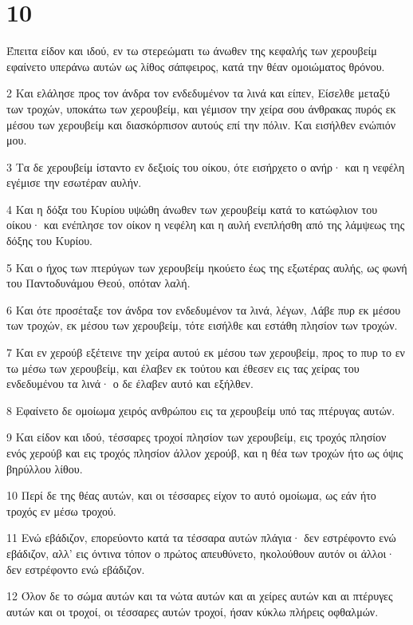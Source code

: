 \chapter{10}

\par Έπειτα είδον και ιδού, εν τω στερεώματι τω άνωθεν της κεφαλής των χερουβείμ εφαίνετο υπεράνω αυτών ως λίθος σάπφειρος, κατά την θέαν ομοιώματος θρόνου.
\par 2 Και ελάλησε προς τον άνδρα τον ενδεδυμένον τα λινά και είπεν, Είσελθε μεταξύ των τροχών, υποκάτω των χερουβείμ, και γέμισον την χείρα σου άνθρακας πυρός εκ μέσου των χερουβείμ και διασκόρπισον αυτούς επί την πόλιν. Και εισήλθεν ενώπιόν μου.
\par 3 Τα δε χερουβείμ ίσταντο εν δεξιοίς του οίκου, ότε εισήρχετο ο ανήρ· και η νεφέλη εγέμισε την εσωτέραν αυλήν.
\par 4 Και η δόξα του Κυρίου υψώθη άνωθεν των χερουβείμ κατά το κατώφλιον του οίκου· και ενέπλησε τον οίκον η νεφέλη και η αυλή ενεπλήσθη από της λάμψεως της δόξης του Κυρίου.
\par 5 Και ο ήχος των πτερύγων των χερουβείμ ηκούετο έως της εξωτέρας αυλής, ως φωνή του Παντοδυνάμου Θεού, οπόταν λαλή.
\par 6 Και ότε προσέταξε τον άνδρα τον ενδεδυμένον τα λινά, λέγων, Λάβε πυρ εκ μέσου των τροχών, εκ μέσου των χερουβείμ, τότε εισήλθε και εστάθη πλησίον των τροχών.
\par 7 Και εν χερούβ εξέτεινε την χείρα αυτού εκ μέσου των χερουβείμ, προς το πυρ το εν τω μέσω των χερουβείμ, και έλαβεν εκ τούτου και έθεσεν εις τας χείρας του ενδεδυμένου τα λινά· ο δε έλαβεν αυτό και εξήλθεν.
\par 8 Εφαίνετο δε ομοίωμα χειρός ανθρώπου εις τα χερουβείμ υπό τας πτέρυγας αυτών.
\par 9 Και είδον και ιδού, τέσσαρες τροχοί πλησίον των χερουβείμ, εις τροχός πλησίον ενός χερούβ και εις τροχός πλησίον άλλον χερούβ, και η θέα των τροχών ήτο ως όψις βηρύλλου λίθου.
\par 10 Περί δε της θέας αυτών, και οι τέσσαρες είχον το αυτό ομοίωμα, ως εάν ήτο τροχός εν μέσω τροχού.
\par 11 Ενώ εβάδιζον, επορεύοντο κατά τα τέσσαρα αυτών πλάγια· δεν εστρέφοντο ενώ εβάδιζον, αλλ' εις όντινα τόπον ο πρώτος απευθύνετο, ηκολούθουν αυτόν οι άλλοι· δεν εστρέφοντο ενώ εβάδιζον.
\par 12 Όλον δε το σώμα αυτών και τα νώτα αυτών και αι χείρες αυτών και αι πτέρυγες αυτών και οι τροχοί, οι τέσσαρες αυτών τροχοί, ήσαν κύκλω πλήρεις οφθαλμών.
